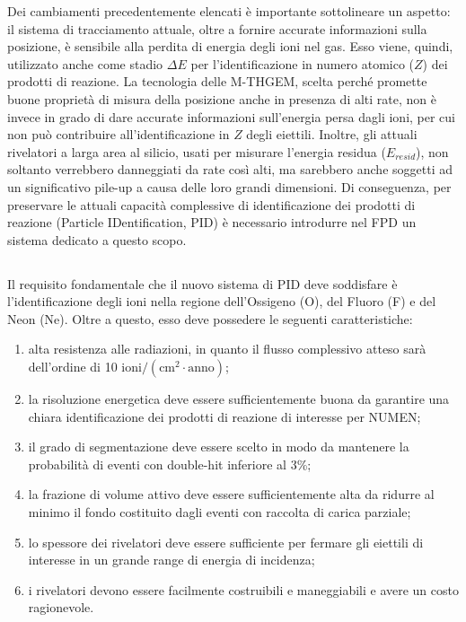 Dei cambiamenti precedentemente elencati è importante sottolineare un aspetto: il sistema di tracciamento attuale, oltre a fornire accurate informazioni sulla posizione, è sensibile alla perdita di energia degli ioni nel gas. Esso viene, quindi, utilizzato anche come stadio $\Delta E$ per l'identificazione in numero atomico ($Z$) dei prodotti di reazione.
La tecnologia delle M-THGEM, scelta perché promette buone proprietà di misura della posizione anche in presenza di alti rate, non è invece in grado di dare accurate informazioni sull'energia persa dagli ioni, per cui non può contribuire all'identificazione in $Z$ degli eiettili.
Inoltre, gli attuali rivelatori a larga area al silicio, usati per misurare l'energia residua ($ E_{resid} $), non soltanto verrebbero danneggiati da rate così alti, ma sarebbero anche soggetti ad un significativo pile-up a causa delle loro grandi dimensioni.
Di conseguenza, per preservare le attuali capacità complessive di identificazione dei prodotti di reazione (Particle IDentification, PID) è necessario introdurre nel FPD un sistema dedicato a questo scopo.



\subsection{} \label{sez:sistema_identif_part}


Il requisito fondamentale che il nuovo sistema di PID deve soddisfare è l'identificazione degli ioni nella regione dell'Ossigeno (O), del Fluoro (F) e del Neon (Ne). 
Oltre a questo, esso deve possedere le seguenti caratteristiche:
\begin{enumerate}
	\item alta resistenza alle radiazioni, in quanto il flusso complessivo atteso sarà dell'ordine di 10 $\mbox{ioni}/(\mbox{cm}^2 \cdot \mbox{anno})$;
	\item la risoluzione energetica deve essere sufficientemente buona da garantire una chiara identificazione dei prodotti di reazione di interesse per NUMEN;
	\item il grado di segmentazione deve essere scelto in modo da mantenere la probabilità di eventi con double-hit inferiore al 3\%;
	\item la frazione di volume attivo deve essere sufficientemente alta da ridurre al minimo il fondo costituito dagli eventi con raccolta di carica parziale;
	\item lo spessore dei rivelatori deve essere sufficiente per fermare gli eiettili di interesse in un grande range di energia di incidenza;
	\item i rivelatori devono essere facilmente costruibili e maneggiabili e avere un costo ragionevole.
\end{enumerate}


